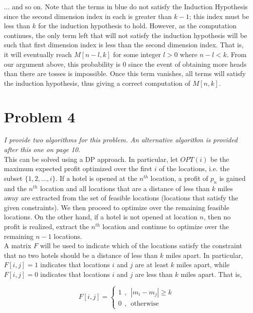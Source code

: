\documentclass[twoside,11pt]{homework}
\begin{document}
$\dots$ and so on.  Note that the terms in {\color{blue} blue} do not satisfy the Induction Hypothesis since the second dimension index in each is greater than $k-1$; this index must be less than $k$ for the induction hypothesis to hold.  However,  as the computation continues,  the only term left that will not satisfy the induction hypothesis will be such that first dimension index is less than the second dimension index.  That is,  it will eventually reach $M[n-l, k]$ for some integer $l >0$ where $n-l < k$.  From our argument above,  this probability is $0$ since the event of obtaining more heads than there are tosses is impossible.  Once this term vanishes, all terms will satisfy the induction hypothesis, thus giving a correct computation of $M[n,k]$. 

\section*{Problem 4}
\textit{I provide two algorithms for this problem. An alternative algorithm is provided after this one on page 10.} \\

\noindent
This can be solved using a DP approach.  In particular,  let $OPT(i)$ be the maximum expected profit optimized over the first $i$ of the locations, i.e. the subset $\{1, 2, \dots,i\}$.   If a hotel is opened at the $n^{th}$ location,  a profit of $p_n$ is gained and the $n^{th}$ location and all locations that are a distance of less than $k$ miles away are extracted from the set of feasible locations (locations that satisfy the given constraints).  We then proceed to optimize over the remaining feasible locations.  On the other hand,  if a hotel is not opened at location $n$, then no profit is realized, extract the $n^{th}$ location and continue to optimize over the remaining $n-1$ locations.     \\

\noindent
A matrix $F$ will be used to indicate which of the locations satisfy the constraint that no two hotels should be a distance of less than $k$ miles apart.  In particular,  $F[i,j] = 1$ indicates that locations $i$ and $j$ are at least $k$ miles apart, while $F[i,j] = 0$ indicates that locations $i$ and $j$ are less than $k$ miles apart.  That is,

$$F[i,j] = 
\begin{cases} 
1 \ \ , \ \ |m_i - m_j| \geq k \\
0 \ \ ,  \ \ \text{otherwise}
\end{cases}
$$
\end{document}
